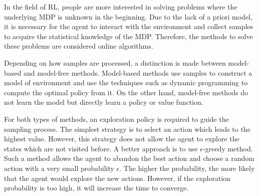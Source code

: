
In the field of RL, people are more interested in solving problems where
the underlying MDP is unknown in the beginning. 
Due to the lack of a priori model, it is necessary for the agent to interact with
the environment and collect samples to acquire the statistical knowledge of the MDP.
Therefore, the methods to solve these
problems are considered online algorithms.

Depending on how samples are processed, a distinction is made between model-based
and model-free methods. Model-based methods use samples to construct 
a model of environment and use the techniques such as dynamic programming
to compute the optimal policy from it.
On the other hand, model-free methods do not learn the model but directly learn
a policy or value function.

For both types of methods, an exploration policy is required to 
guide the sampling process.
The simplest strategy is to select an action which leads to the highest value. However, 
this strategy does not allow the agent to explore the states which are not visited before.
A better approach is to use $\epsilon$-greedy method. Such a method allows the agent to abandon the
best action and choose a random action with a very small probability $\epsilon$. The higher the probability, the more
likely that the agent would explore the new actions. However, if the exploration probability 
is too high, it will increase the time to converge.





